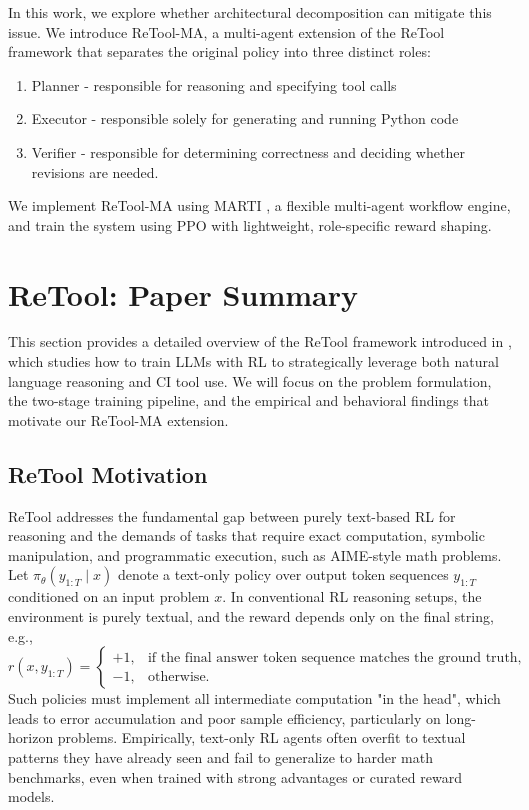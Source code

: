 \documentclass{article}
\begin{document}
In this work, we explore whether architectural decomposition can mitigate
this issue. We introduce ReTool-MA, a multi-agent extension of the
ReTool framework that separates the original policy into three distinct roles:
\begin{enumerate}
    \item Planner - responsible for reasoning and specifying tool calls
    \item Executor - responsible solely for generating and running Python code
    \item Verifier - responsible for determining correctness and deciding whether
    revisions are needed. 
\end{enumerate}
We implement ReTool-MA using MARTI \citep{marti2025},
a flexible multi-agent workflow engine, and train the system using PPO with 
lightweight, role-specific reward shaping.

\section{ReTool: Paper Summary}
This section provides a detailed overview of the ReTool framework introduced in 
\citep{feng2025retoolreinforcementlearningstrategic}, which studies how to train 
LLMs with RL to strategically leverage both natural language reasoning and CI tool use.
We will focus on the problem formulation, the two-stage training pipeline, and the 
empirical and behavioral findings that motivate our ReTool-MA extension.

\subsection{ReTool Motivation}
ReTool addresses the fundamental gap between purely text-based RL for reasoning 
and the demands of tasks that require exact computation, symbolic manipulation, 
and programmatic execution, such as AIME-style math problems. Let 
$\pi_\theta(y_{1:T} \mid x)$ denote a text-only policy over output token sequences 
$y_{1:T}$ conditioned on an input problem $x$. In conventional RL reasoning setups, 
the environment is purely textual, and the reward depends only on the final 
string, e.g.,
\begin{equation}
  r(x, y_{1:T}) = 
  \begin{cases}
    +1, & \text{if the final answer token sequence matches the ground truth,} \\
    -1, & \text{otherwise.}
  \end{cases}
\end{equation}
Such policies must implement all intermediate computation "in the head", which 
leads to error accumulation and poor sample efficiency, particularly on long-horizon problems.
Empirically, text-only RL agents often overfit to textual patterns they have already seen and 
fail to generalize to harder math benchmarks, even when trained with strong 
advantages or curated reward models.
\end{document}
